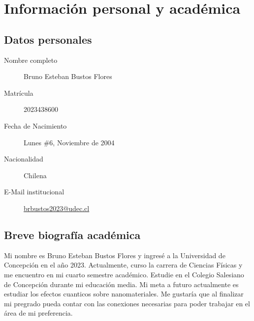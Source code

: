 \documentclass[../portafolio.tex]{subfiles}
\begin{document}
\chapter*{Información personal y académica}


\section*{Datos personales}

\begin{description}
\item[{Nombre completo}] Bruno Esteban Bustos Flores %
\item[{Matrícula}] 2023438600 %
\item[{Fecha de Nacimiento}] Lunes \#6, Noviembre de 2004 %
\item[{Nacionalidad}] Chilena
\item[{E-Mail institucional}] \href{mailto:brbustos2023@udec.cl}{brbustos2023@udec.cl}
\end{description}


\section*{Breve biografía académica}

Mi nombre es Bruno Esteban Bustos Flores y ingresé a la Universidad de
Concepción en el año 2023. Actualmente, curso la carrera de Ciencias
Físicas y me encuentro en mi cuarto semestre académico. Estudie en el 
Colegio Salesiano de Concepción durante mi educación media. Mi meta a 
futuro actualmente es estudiar los efectos cuanticos sobre nanomateriales.
Me gustaría que al finalizar mi pregrado pueda contar con las conexiones
necesarias para poder trabajar en el área de mi preferencia. 
\end{document}
